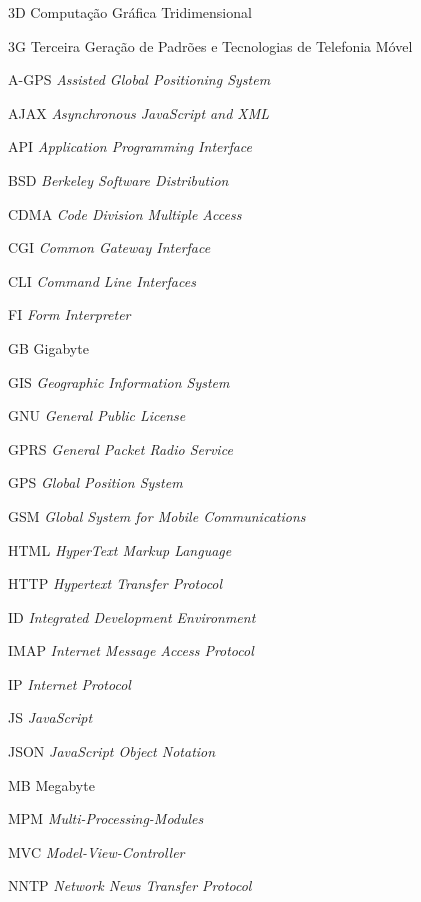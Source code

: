 
\begin{siglas}
    \item[3D] Computação Gráfica Tridimensional
    \item[3G] Terceira Geração de Padrões e Tecnologias de Telefonia Móvel
    \item[A-GPS] \textit{Assisted Global Positioning System}
    \item[AJAX] \textit{Asynchronous JavaScript and XML}
    \item[API] \textit{Application Programming Interface}
    \item[BSD] \textit{Berkeley Software Distribution}
    \item[CDMA] \textit{Code Division Multiple Access}
    \item[CGI] \textit{Common Gateway Interface}
    \item[CLI] \textit{Command Line Interfaces}
    \item[FI] \textit{Form Interpreter}
    \item[GB] Gigabyte
    \item[GIS] \textit{Geographic Information System}
    \item[GNU] \textit{General Public License}
    \item[GPRS] \textit{General Packet Radio Service}
    \item[GPS] \textit{Global Position System}
    \item[GSM] \textit{Global System for Mobile Communications}
    \item[HTML] \textit{HyperText Markup Language}
    \item[HTTP] \textit{Hypertext Transfer Protocol}
    \item[ID] \textit{Integrated Development Environment}
    \item[IMAP] \textit{Internet Message Access Protocol}
    \item[IP] \textit{Internet Protocol}
    \item[JS] \textit{JavaScript}
    \item[JSON] \textit{JavaScript Object Notation}
    \item[MB] Megabyte
    \item[MPM] \textit{Multi-Processing-Modules}
    \item[MVC] \textit{Model-View-Controller}
    \item[NNTP] \textit{Network News Transfer Protocol}

\end{siglas}
